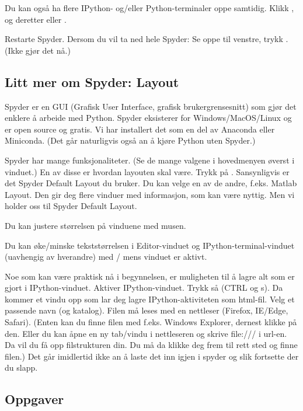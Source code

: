 {Du kan også ha flere IPython- og/eller Python-terminaler oppe samtidig. Klikk , og deretter  eller .

Restarte Spyder. Dersom du vil ta ned hele Spyder: Se oppe til venstre, trykk . (Ikke gjør det nå.) 

\subsection{Litt mer om Spyder: Layout} 
Spyder er en GUI (Grafisk User Interface, grafisk brukergrensesnitt) som gjør det enklere å arbeide med Python. Spyder eksisterer for Windows/MacOS/Linux og er open source og gratis. Vi har installert det som en del av Anaconda eller Miniconda. (Det går naturligvis også an å kjøre Python uten Spyder.)

Spyder har mange funksjonaliteter. (Se de mange valgene i hovedmenyen øverst i vinduet.) En av disse er hvordan layouten skal være. Trykk på . Sansynligvis er det Spyder Default Layout du bruker. Du kan velge en av de andre, f.eks. Matlab Layout. Den gir deg flere vinduer med informasjon, som kan være nyttig. Men vi holder oss til Spyder Default Layout.

Du kan justere størrelsen på vinduene med musen.

Du kan øke/minske tekststørrelsen i Editor-vinduet og IPython-terminal-vinduet (uavhengig av hverandre) med  /  mens vinduet er aktivt. 

Noe som kan være praktisk nå i begynnelsen, er muligheten til å lagre alt som er gjort i IPython-vinduet. Aktiver IPython-vinduet. Trykk så  (CTRL og s). Da kommer et vindu opp som lar deg lagre IPython-aktiviteten som html-fil. Velg et passende navn (og katalog). Filen må leses med en nettleser (Firefox, IE/Edge, Safari). (Enten kan du finne filen med f.eks. Windows Explorer, dernest klikke på den. Eller du kan åpne en ny tab/vindu i nettleseren og skrive file:/// i url-en. Da vil du få opp filstrukturen din. Du må da klikke deg frem til rett sted og finne filen.) Det går imidlertid ikke an å laste det inn igjen i spyder og slik fortsette der du slapp. 

\subsection{Oppgaver}

}
